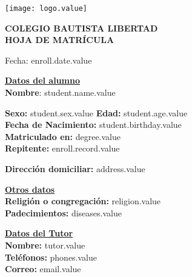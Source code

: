 \documentclass[12pt]{article}
\newcommand{\aField}[1]{#1}
\newcommand{\studentName}{student.name.value}
\newcommand{\studentBirthday}{student.birthday.value}
\newcommand{\studentAge}{student.age.value}
\newcommand{\studentSex}{student.sex.value}
\newcommand{\enrollRecord}{enroll.record.value}
\newcommand{\degree}{degree.value}
\newcommand{\address}{address.value}
\newcommand{\religion}{religion.value}
\newcommand{\diseases}{diseases.value}
\newcommand{\tutor}{tutor.value}
\newcommand{\phones}{phones.value}
\newcommand{\email}{email.value}
\newcommand{\enrollDate}{enroll.date.value}
\begin{document}
    \begin{minipage}[c][2.5cm]{0.2\textwidth}
        \texttt{[image: logo.value]}
    \end{minipage}
    \begin{minipage}[c][2.5cm]{0.6\textwidth}
        \begin{center}
            \textbf{\large COLEGIO BAUTISTA LIBERTAD\\HOJA DE MATRÍCULA}
        \end{center}
    \end{minipage}
    
    \hfill Fecha: \enrollDate
    
    \textbf{\uline{Datos del alumno}}\\
    \textbf{Nombre}: \aField{\studentName}
    \par\vspace{1mm}
    \begin{minipage}[t]{0.48\textwidth}
        \textbf{Sexo:} \aField{\studentSex}\hspace{7mm} \textbf{Edad:} \aField{\studentAge}\\
        \textbf{Fecha de Nacimiento:} \aField{\studentBirthday}\\
        \textbf{Matriculado en:} \aField{\degree}\\
        \textbf{Repitente:} \aField{\enrollRecord}
    \end{minipage}
    \hfill
    \begin{minipage}[t]{0.48\textwidth}
        \textbf{Dirección domiciliar:} \aField{\address}
    \end{minipage}
    \par\vspace{4mm}
    \begin{minipage}[t]{0.48\textwidth}
        \textbf{\uline{Otros datos}}\\
        \textbf{Religión o congregación:} \aField{\religion}\\
        \textbf{Padecimientos:} \aField{\diseases}
    \end{minipage}
    \hfill
    \begin{minipage}[t]{0.48\textwidth}
        \textbf{\uline{Datos del Tutor}}\\
        \textbf{Nombre:} \aField{\tutor}\\
        \textbf{Teléfonos:} \aField{\phones}\\
        \textbf{Correo:} \aField{\email}
    \end{minipage}
\end{document}
